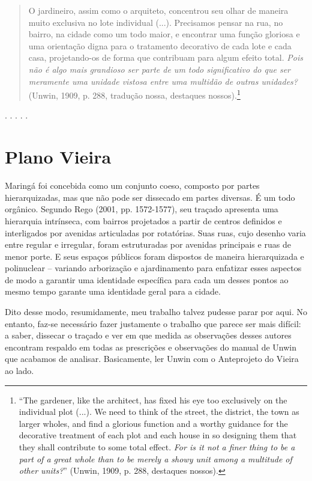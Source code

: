 \documentclass[12pt, a4paper]{book} %
\begin{document}
        \begin{quotation}
            O jardineiro, assim como o arquiteto, concentrou seu olhar de maneira muito exclusiva no lote individual (...). Precisamos pensar na rua, no bairro, na cidade como um todo maior, e encontrar uma função gloriosa e uma orientação digna para o tratamento decorativo de cada lote e cada casa, projetando-os de forma que contribuam para algum efeito total. \textit{Pois não é algo mais grandioso ser parte de um todo significativo do que ser meramente uma unidade vistosa entre uma multidão de outras unidades?} (Unwin, 1909, p. 288, tradução nossa, destaques nossos).\footnote[92]{``The gardener, like the architect, has fixed his eye too exclusively on the individual plot (...). We need to think of the street, the district, the town as larger wholes, and find a glorious function and a worthy guidance for the decorative treatment of each plot and each house in so designing them that they shall contribute to some total effect. \textit{For is it not a finer thing to be a part of a great whole than to be merely a showy unit among a multitude of other units?}'' (Unwin, 1909, p. 288, destaques nossos).}
        \end{quotation}
        

        \begin{center}
            . . . . .
        \end{center} 

            \section{Plano Vieira}

        Maringá foi concebida como um conjunto coeso, composto por partes hierarquizadas, mas que não pode ser dissecado em partes diversas. É um todo orgânico. Segundo Rego (2001, pp. 1572-1577), seu traçado apresenta uma hierarquia intrínseca, com bairros projetados a partir de centros definidos e interligados por avenidas articuladas por rotatórias. Suas ruas, cujo desenho varia entre regular e irregular, foram estruturadas por avenidas principais e ruas de menor porte. E seus espaços públicos foram dispostos de maneira hierarquizada e polinuclear – variando arborização e ajardinamento para enfatizar esses aspectos de modo a garantir uma identidade específica para cada um desses pontos ao mesmo tempo garante uma identidade geral para a cidade.

        Dito desse modo, resumidamente, meu trabalho talvez pudesse parar por aqui. No entanto, faz-se necessário fazer justamente o trabalho que parece ser mais difícil: a saber, dissecar o traçado e ver em que medida as observações desses autores encontram respaldo em todas as prescrições e observações do manual de Unwin que acabamos de analisar. Basicamente, ler Unwin com o Anteprojeto do Vieira ao lado.
\end{document}
